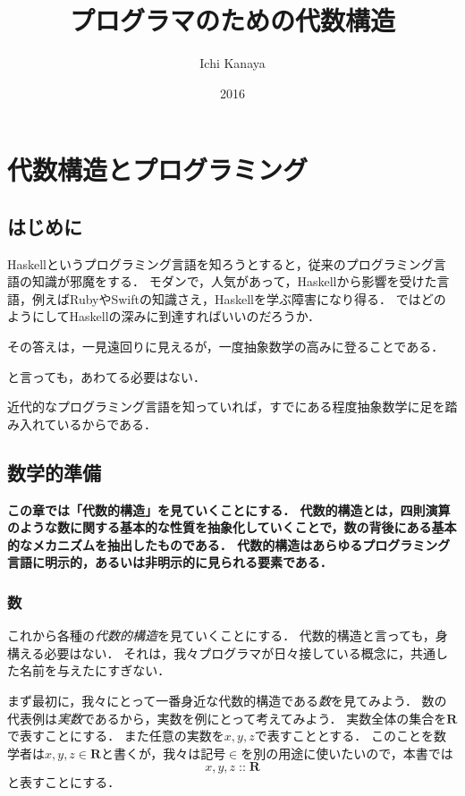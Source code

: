 \documentclass[twocolumn]{jsbook}
\title{プログラマのための代数構造}
\author{Ichi Kanaya}
\date{2016}
\newcommand{\mathIn}[1]{\mathop{::}#1}
\newcommand{\mathSet}[1]{\mathbf{#1}}
\newcommand{\keyword}[1]{\emph{#1}}
\newenvironment{leader}{\begingroup\bf}{\endgroup}
\begin{document}
\maketitle
\tableofcontents

\part{代数構造とプログラミング}

\chapter{はじめに}

Haskellというプログラミング言語を知ろうとすると，従来のプログラミング言語の知識が邪魔をする．
モダンで，人気があって，Haskellから影響を受けた言語，例えばRubyやSwiftの知識さえ，Haskellを学ぶ障害になり得る．
ではどのようにしてHaskellの深みに到達すればいいのだろうか．

その答えは，一見遠回りに見えるが，一度抽象数学の高みに登ることである．

と言っても，あわてる必要はない．

近代的なプログラミング言語を知っていれば，すでにある程度抽象数学に足を踏み入れているからである．

\chapter{数学的準備}

\begin{leader}
この章では「代数的構造」を見ていくことにする．
代数的構造とは，四則演算のような数に関する基本的な性質を抽象化していくことで，数の背後にある基本的なメカニズムを抽出したものである．
代数的構造はあらゆるプログラミング言語に明示的，あるいは非明示的に見られる要素である．
\end{leader}

\section{数}

これから各種の\keyword{代数的構造}を見ていくことにする．
代数的構造と言っても，身構える必要はない．
それは，我々プログラマが日々接している概念に，共通した名前を与えたにすぎない．

まず最初に，我々にとって一番身近な代数的構造である\keyword{数}を見てみよう．
数の代表例は\keyword{実数}であるから，実数を例にとって考えてみよう．
実数全体の集合を$\mathSet{R}$で表すことにする．
また任意の実数を$x,y,z$で表すこととする．
このことを数学者は$x,y,z\in\mathSet{R}$と書くが，我々は記号$\in$を別の用途に使いたいので，本書では$$x,y,z\mathIn\mathSet{R}$$と表すことにする．
\end{document}
